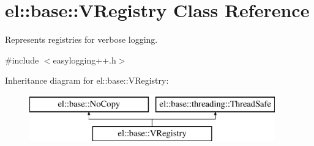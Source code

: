 \hypertarget{classel_1_1base_1_1_v_registry}{}\section{el\+:\+:base\+:\+:V\+Registry Class Reference}
\label{classel_1_1base_1_1_v_registry}


Represents registries for verbose logging.  




{\ttfamily \#include $<$easylogging++.\+h$>$}

Inheritance diagram for el\+:\+:base\+:\+:V\+Registry\+:\begin{figure}[H]
\begin{center}
\leavevmode
\includegraphics[height=2.000000cm]{classel_1_1base_1_1_v_registry}
\end{center}
\end{figure}
